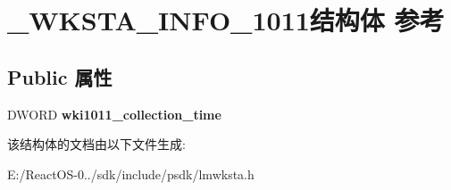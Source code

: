 \hypertarget{struct___w_k_s_t_a___i_n_f_o__1011}{}\section{\+\_\+\+W\+K\+S\+T\+A\+\_\+\+I\+N\+F\+O\+\_\+1011结构体 参考}
\label{struct___w_k_s_t_a___i_n_f_o__1011}
\subsection*{Public 属性}
\begin{DoxyCompactItemize}
\item 
\mbox{\label{struct___w_k_s_t_a___i_n_f_o__1011_a408b2d158c6a4cdab72c7cfc136243bb}} 
D\+W\+O\+RD {\bfseries wki1011\+\_\+collection\+\_\+time}
\end{DoxyCompactItemize}


该结构体的文档由以下文件生成\+:\begin{DoxyCompactItemize}
\item 
E\+:/\+React\+O\+S-\/0../sdk/include/psdk/lmwksta.\+h\end{DoxyCompactItemize}
